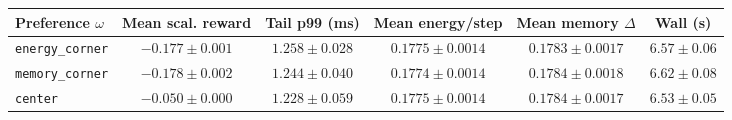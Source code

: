 \begin{tabular}{lccccc}
\toprule
Preference $\omega$ & Mean scal. reward & Tail p99 (ms) & Mean energy/step & Mean memory $\Delta$ & Wall (s) \\
\midrule
\texttt{energy\_corner} & $-0.177 \pm 0.001$ & $1.258 \pm 0.028$ & $0.1775 \pm 0.0014$ & $0.1783 \pm 0.0017$ & $6.57 \pm 0.06$ \\
\texttt{memory\_corner} & $-0.178 \pm 0.002$ & $1.244 \pm 0.040$ & $0.1774 \pm 0.0014$ & $0.1784 \pm 0.0018$ & $6.62 \pm 0.08$ \\
\texttt{center} & $-0.050 \pm 0.000$ & $1.228 \pm 0.059$ & $0.1775 \pm 0.0014$ & $0.1784 \pm 0.0017$ & $6.53 \pm 0.05$ \\
\bottomrule
\end{tabular}
